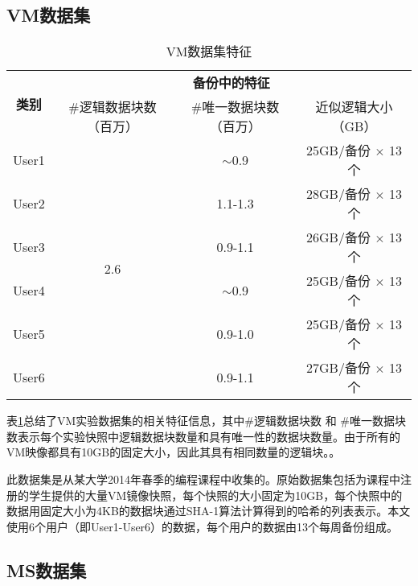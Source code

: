 \subsection{VM数据集}

\begin{table}[!hbt]
    \caption{VM数据集特征}
\small
\label{tab:VM-dataset}
\renewcommand{\arraystretch}{1.2}
\vspace{-3pt}
\centering
\begin{tabular}{|c|c|c|c|}
\hline
\multirow{2}{*}{\bf 类别} & \multicolumn{3}{c|}{\bf 备份中的特征} \\
\cline{2-4}
    & \#逻辑数据块数（百万） & \#唯一数据块数（百万） & 近似逻辑大小（GB）\\

\hline
User1  &  \multirow{6}{*}{2.6} & $\sim$0.9 & 25GB/备份 $\times$ 13 个 \\
\cline{1-1}
\cline{3-4}
User2 &  & 1.1-1.3 & 28GB/备份 $\times$ 13 个\\
\cline{1-1}
\cline{3-4}
User3 &  & 0.9-1.1 & 26GB/备份 $\times$ 13 个\\
\cline{1-1}
\cline{3-4}
User4 &  & $\sim$0.9 & 25GB/备份 $\times$ 13 个\\
\cline{1-1}
\cline{3-4}
User5 &  & 0.9-1.0 & 25GB/备份 $\times$ 13 个\\
\cline{1-1}
\cline{3-4}
User6 &  & 0.9-1.1 & 27GB/备份 $\times$ 13 个\\
\hline
\end{tabular} 
\end{table}

表\ref{tab:VM-dataset}总结了VM实验数据集的相关特征信息，其中\#逻辑数据块数 和 \#唯一数据块数表示每个实验快照中逻辑数据块数量和具有唯一性的数据块数量。由于所有的VM映像都具有10GB的固定大小，因此其具有相同数量的逻辑块。。

此数据集是从某大学2014年春季的编程课程中收集的。原始数据集包括为课程中注册的学生提供的大量VM镜像快照，每个快照的大小固定为10GB，每个快照中的数据用固定大小为4KB的数据块通过SHA-1算法计算得到的哈希的列表表示。本文使用6个用户（即User1-User6）的数据，每个用户的数据由13个每周备份组成。

\subsection{MS数据集}

